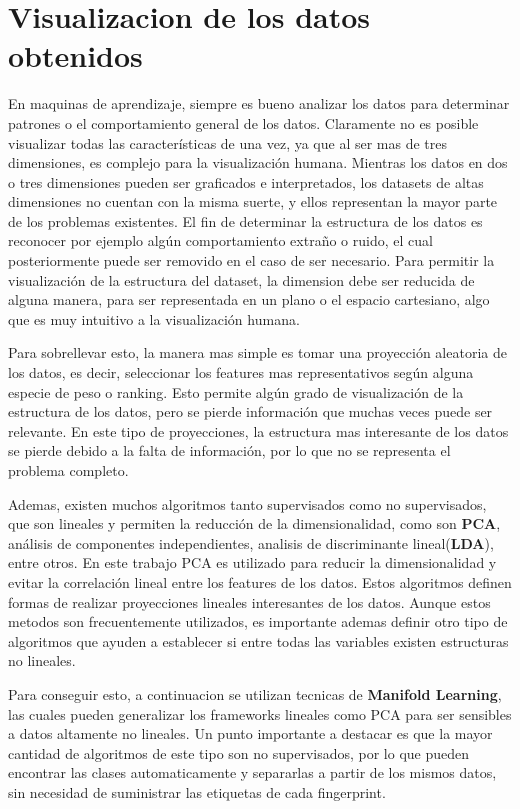 \section{Visualizacion de los datos obtenidos}

En maquinas de aprendizaje, siempre es bueno analizar los datos para determinar patrones o el comportamiento general de los datos. Claramente no es posible visualizar todas las características de una vez, ya 	que al ser mas de tres dimensiones, es complejo para la visualización humana. Mientras los datos en dos o tres  dimensiones pueden ser graficados e interpretados, los datasets de altas dimensiones no cuentan con la misma suerte, y ellos representan la mayor parte de los problemas existentes. El fin de determinar la estructura de los datos es reconocer por ejemplo algún comportamiento extraño o ruido, el cual posteriormente puede ser removido en el caso de ser necesario. Para permitir la visualización de la estructura del dataset, la dimension debe ser reducida de alguna manera, para ser representada en un plano o el espacio cartesiano, algo que es muy intuitivo a la visualización humana.

Para sobrellevar esto, la manera mas simple es tomar una proyección aleatoria de los datos, es decir, seleccionar los features mas representativos según alguna especie de peso o ranking. Esto permite algún grado de visualización de la estructura de los datos, pero se pierde información que muchas veces puede ser relevante. En este tipo de proyecciones, la estructura mas interesante de los datos se pierde debido a la falta de información, por lo que no se representa el problema completo.

Ademas, existen muchos algoritmos tanto supervisados como no supervisados, que son lineales y permiten la reducción de la dimensionalidad, como son \textbf{PCA},  análisis de componentes independientes, analisis de discriminante lineal(\textbf{LDA}), entre otros. En este trabajo PCA es utilizado para reducir la dimensionalidad y evitar la correlación lineal entre los features de los datos. Estos algoritmos definen formas de realizar proyecciones lineales interesantes de los datos. Aunque estos metodos son frecuentemente utilizados, es importante ademas definir otro tipo de algoritmos que ayuden a establecer si entre todas las variables existen estructuras no lineales.

Para conseguir esto, a continuacion se utilizan tecnicas de \textbf{Manifold Learning}, las cuales pueden generalizar los frameworks lineales como PCA para ser sensibles a datos altamente no lineales. Un punto importante a destacar es que la mayor cantidad de algoritmos de este tipo son no supervisados, por lo que pueden encontrar las clases automaticamente y separarlas a partir de los mismos datos, sin necesidad de suministrar las etiquetas de cada fingerprint.

